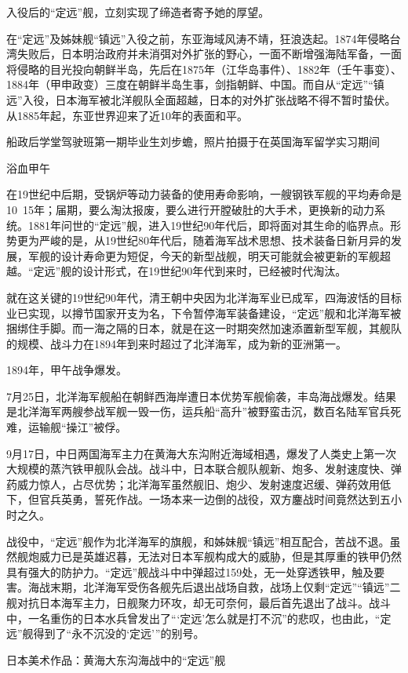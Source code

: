\documentclass[12pt,UTF8]{ctexbook}
\begin{document}
入役后的“定远”舰，立刻实现了缔造者寄予她的厚望。

在“定远”及姊妹舰“镇远”入役之前，东亚海域风涛不靖，狂浪迭起。1874年侵略台湾失败后，日本明治政府并未消弭对外扩张的野心，一面不断增强海陆军备，一面将侵略的目光投向朝鲜半岛，先后在1875年（江华岛事件）、1882年（壬午事变）、1884年（甲申政变）三度在朝鲜半岛生事，剑指朝鲜、中国。而自从“定远”“镇远”入役，日本海军被北洋舰队全面超越，日本的对外扩张战略不得不暂时蛰伏。从1885年起，东亚世界迎来了近10年的表面和平。


船政后学堂驾驶班第一期毕业生刘步蟾，照片拍摄于在英国海军留学实习期间

浴血甲午

在19世纪中后期，受锅炉等动力装备的使用寿命影响，一艘钢铁军舰的平均寿命是10~15年；届期，要么淘汰报废，要么进行开膛破肚的大手术，更换新的动力系统。1881年问世的“定远”舰，进入19世纪90年代后，即将面对其生命的临界点。形势更为严峻的是，从19世纪80年代后，随着海军战术思想、技术装备日新月异的发展，军舰的设计寿命更为短促，今天的新型战舰，明天可能就会被更新的军舰超越。“定远”舰的设计形式，在19世纪90年代到来时，已经被时代淘汰。

就在这关键的19世纪90年代，清王朝中央因为北洋海军业已成军，四海波恬的目标业已实现，以撙节国家开支为名，下令暂停海军装备建设，“定远”舰和北洋海军被捆绑住手脚。而一海之隔的日本，就是在这一时期突然加速添置新型军舰，其舰队的规模、战斗力在1894年到来时超过了北洋海军，成为新的亚洲第一。

1894年，甲午战争爆发。

7月25日，北洋海军舰船在朝鲜西海岸遭日本优势军舰偷袭，丰岛海战爆发。结果是北洋海军两艘参战军舰一毁一伤，运兵船“高升”被野蛮击沉，数百名陆军官兵死难，运输舰“操江”被俘。

9月17日，中日两国海军主力在黄海大东沟附近海域相遇，爆发了人类史上第一次大规模的蒸汽铁甲舰队会战。战斗中，日本联合舰队舰新、炮多、发射速度快、弹药威力惊人，占尽优势；北洋海军虽然舰旧、炮少、发射速度迟缓、弹药效用低下，但官兵英勇，誓死作战。一场本来一边倒的战役，双方鏖战时间竟然达到五小时之久。

战役中，“定远”舰作为北洋海军的旗舰，和姊妹舰“镇远”相互配合，苦战不退。虽然舰炮威力已是英雄迟暮，无法对日本军舰构成大的威胁，但是其厚重的铁甲仍然具有强大的防护力。“定远”舰战斗中中弹超过159处，无一处穿透铁甲，触及要害。海战末期，北洋海军受伤各舰先后退出战场自救，战场上仅剩“定远”“镇远”二舰对抗日本海军主力，日舰聚力环攻，却无可奈何，最后首先退出了战斗。战斗中，一名重伤的日本水兵曾发出了“‘定远’怎么就是打不沉”的悲叹，也由此，“定远”舰得到了“永不沉没的‘定远’”的别号。


日本美术作品：黄海大东沟海战中的“定远”舰
\end{document}
